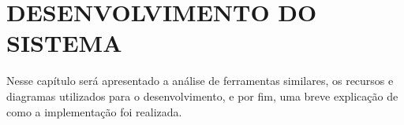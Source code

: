 \chapter{DESENVOLVIMENTO DO SISTEMA}
\label{chap:desenvolvimento}

Nesse capítulo será apresentado a análise de ferramentas similares, os recursos e diagramas utilizados para o desenvolvimento, e por fim, uma breve explicação de como a implementação foi realizada.





